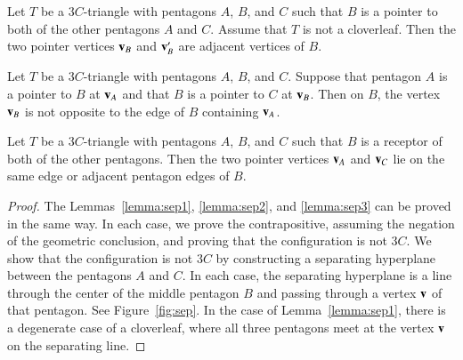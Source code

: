 \begin{lemma}\label{lemma:sep1} 
Let $T$ be a $3C$-triangle with pentagons $A$, $B$, and $C$ such that
$B$ is a pointer to both of the other pentagons $A$ and $C$.  
Assume that $T$ is not a cloverleaf.
Then the two pointer vertices ${\mathbf v}_B$ and ${\mathbf v}_B'$ are adjacent
vertices of $B$.
\end{lemma}

\begin{lemma}\label{lemma:sep2}  
Let $T$ be a $3C$-triangle with pentagons $A$, $B$, and $C$.
Suppose that pentagon
$A$ is a pointer to $B$ at ${\mathbf v}_A$ and that $B$ is a pointer to $C$
at ${\mathbf v}_B$.  Then on $B$, the vertex
${\mathbf v}_B$ is not opposite to the edge of $B$ containing
${\mathbf v}_A$.
\end{lemma}

\begin{lemma}\label{lemma:sep3} 
Let $T$ be a $3C$-triangle with pentagons $A$, $B$, and $C$ 
such that $B$ is a receptor of both of
  the other pentagons.  Then the two pointer vertices
  ${\mathbf v}_A$ and ${\mathbf v}_C$ lie on the same edge or adjacent pentagon edges of
  $B$. 
\end{lemma}





\begin{proof} The Lemmas~\ref{lemma:sep1}, \ref{lemma:sep2}, and
  \ref{lemma:sep3} can be proved in the same way.  In each case, we
  prove the contrapositive, assuming the negation of the geometric
  conclusion, and proving that the configuration is not $3C$.  We show
  that the configuration is not $3C$ by constructing a separating
  hyperplane between the pentagons $A$ and $C$.  In each case, the
  separating hyperplane is a line through the center of the middle
  pentagon $B$ and passing through a vertex ${\mathbf v}$ of that pentagon.  See
  Figure~\ref{fig:sep}.  In the case of Lemma~\ref{lemma:sep1}, there
  is a degenerate case of a cloverleaf, where all three pentagons meet
  at the vertex ${\mathbf v}$ on the separating line.
\end{proof}

